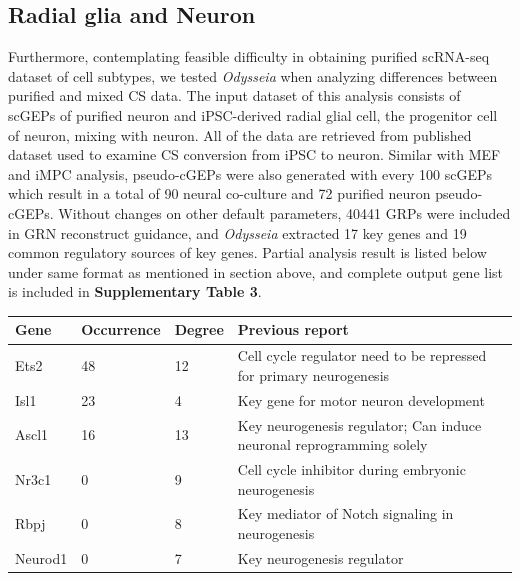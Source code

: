 \documentclass[fleqn,10pt]{wlscirep}
\begin{document}
\subsection*{Radial glia and Neuron}
Furthermore, contemplating feasible difficulty in obtaining purified scRNA-seq dataset of cell subtypes, we tested \emph{Odysseia} when analyzing differences between purified and mixed CS data.
The input dataset of this analysis consists of scGEPs of purified neuron and iPSC-derived radial glial cell, the progenitor cell of neuron, mixing with neuron.
All of the data are retrieved from published dataset used to examine CS conversion from iPSC to neuron.\cite{ips_neuron_ascl1}
Similar with MEF and iMPC analysis, pseudo-cGEPs were also generated with every 100 scGEPs which result in a total of 90 neural co-culture and 72 purified neuron pseudo-cGEPs.
Without changes on other default parameters, 40441 GRPs were included in GRN reconstruct guidance, and \emph{Odysseia} extracted 17 key genes and 19 common regulatory sources of key genes.
Partial analysis result is listed below under same format as mentioned in section above, and complete output gene list is included in \textbf{Supplementary Table 3}.

\begin{table}[ht]
\centering
\begin{tabular}{|l|l|l|l|}
\hline
\textbf{Gene} & \textbf{Occurrence} & \textbf{Degree} & \textbf{Previous report}  \\
\hline
Ets2 & 48 & 12 & Cell cycle regulator need to be repressed for primary neurogenesis\cite{ets2_1, ets2_2} \\
\hline
Isl1 & 23 & 4 & Key gene for motor neuron development\cite{isl1_1, isl1_2011, isl1_repro}\\
\hline
Ascl1 & 16 & 13 & Key neurogenesis regulator\cite{ips_neuron_ascl1, ascl1_1}; Can induce neuronal reprogramming solely\cite{ascl1_1frepro ,ascl1_repro} \\
\hline
Nr3c1 & 0 & 9 & Cell cycle inhibitor during embryonic neurogenesis\cite{nr3c1}\\
\hline
Rbpj & 0 & 8 & Key mediator of Notch signaling in neurogenesis\cite{rbpj_1, rbpj_2, rbpj_3}\\
\hline
Neurod1 & 0 & 7 & Key neurogenesis regulator\cite{ips_neuron_ascl1, neurod1_1, neurod1_2, neurod1_3, neurod1_4} \\
\hline
\end{tabular}
\end{table}
\end{document}
